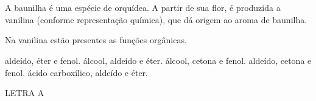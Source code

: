 \documentclass[10pt]{scrartcl}
\begin{document}






\section*{}






\begin{exercise}[points=1.0]
A baunilha é uma espécie de orquídea. A partir de sua flor, é produzida a vanilina (conforme representação química), que dá origem ao aroma de baunilha.

\begin{center}
\end{center}


Na vanilina estão presentes as funções orgânicas.

\begin{choice}
\choice aldeído, éter e fenol.
\choice álcool, aldeído e éter.
\choice álcool, cetona e fenol.
\choice aldeído, cetona e fenol.
\choice ácido carboxílico, aldeído e éter.
\end{choice}
\end{exercise}
\begin{solution}
LETRA A
\end{solution}
\end{document}
